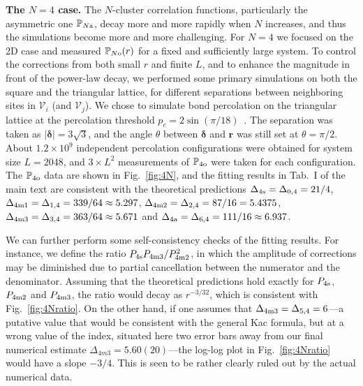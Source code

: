 \documentclass[aps,prl,twocolumn,showpacs,superscriptaddress,groupedaddress]{revtex4}  %
\def\bbp{{\mathbb P}}
\begin{document}
{\bf The $N=4$ case.} The $N$-cluster correlation functions, particularly the asymmetric one $\bbp_{N {\rm a}}$, 
decay more and more rapidly when $N$ increases, and thus the simulations become more and more challenging. 
For $N=4$ we focused on the 2D case and measured $\bbp_{N {\rm o}}(r)$  for a fixed and sufficiently large system.
To control the corrections from both small $r$ and finite $L$, and to enhance the magnitude in front of the power-law decay, 
we performed some primary simulations on both the square and the triangular lattice, 
for different separations between neighboring sites in $\mathcal{V}_i$ (and $\mathcal{V}_j$).
We chose to simulate bond percolation on the triangular lattice at the percolation 
threshold $p_c=2\sin (\pi/18)$~\cite{Sykes}. 
The separation was taken as $|\boldsymbol\delta| = 3 \sqrt{3}$, and
the angle $\theta$ between $\boldsymbol\delta$ and $\mathbf{r}$ was still set at $\theta=\pi/2$.
About $1.2 \times 10^9$ independent percolation configurations were obtained for system size $L=2048$, 
and  $3 \times L^2$ measurements of $\bbp_{4 {\rm o}}$  were taken for each configuration. 
The $\bbp_{4 {\rm o}}$ data are shown in Fig.~\ref{fig:4N},  and the fitting results in Tab.~I of the main text
are consistent with the theoretical predictions $\Delta_{\rm 4s}=\Delta_{0,4}=21/4$, 
$\Delta_{\rm 4m1} =\Delta_{1,4}=339/64 \approx5.297$, $\Delta_{\rm 4m2}=\Delta_{2,4}= 87/16=5.4375$,
$\Delta_{\rm 4m3}=\Delta_{3,4}= 363/64 \approx 5.671$ and $\Delta_{\rm 4a}=\Delta_{6,4}=111/16\approx6.937$.

We can further perform some self-consistency checks of the fitting results. 
For instance, we define the ratio $P_{\rm 4s} P_{\rm 4m3}/P_{\rm 4m2}^2$, in which the amplitude of corrections 
may be diminished due to partial cancellation between the numerator and the denominator. 
Assuming that the theoretical predictions hold exactly for $P_{\rm 4s}$, $P_{\rm 4m2}$ and $P_{\rm 4m3}$, 
the ratio would decay as $r^{-3/32}$, which is consistent with Fig.~\ref{fig:4Nratio}. 
On the other hand, if one assumes that $\Delta_{\rm 4m3} = \Delta_{5,4}=6$---a putative value that would be consistent with the general Kac formula,
but at a wrong value of the index, situated here two error bars away from our final numerical estimate $\Delta_{4m3}=5.60(20)$---the
log-log plot in Fig.~\ref{fig:4Nratio} would have a slope $-3/4$. This is seen to be rather clearly ruled out by the actual numerical data.


\end{document}
